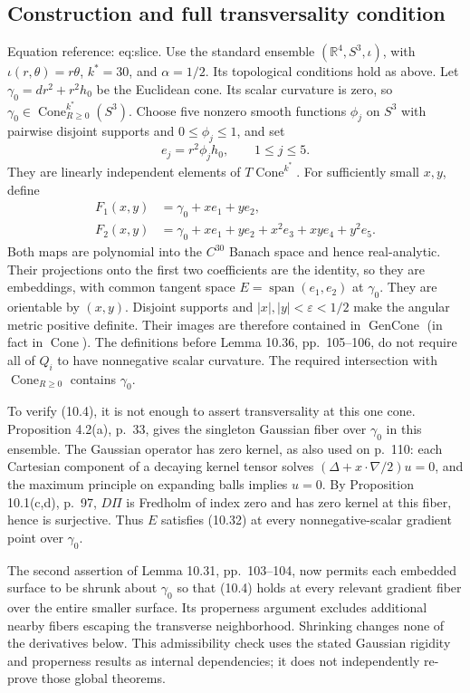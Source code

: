 \documentclass[10pt]{article}
\begin{document}
\subsection*{Construction and full transversality condition}
Equation reference: eq:slice. Use the standard ensemble \((\mathbb R^4,S^3,\iota)\), with \(\iota(r,\theta)=r\theta\), \(k^*=30\), and \(\alpha=1/2\). Its topological conditions hold as above. Let \(\gamma_0=dr^2+r^2h_0\) be the Euclidean cone. Its scalar curvature is zero, so \(\gamma_0\in\operatorname{Cone}_{R\geq0}^{k^*}(S^3)\). Choose five nonzero smooth functions \(\phi_j\) on \(S^3\) with pairwise disjoint supports and \(0\leq\phi_j\leq1\), and set \[e_j=r^2\phi_j h_0,\qquad 1\leq j\leq5 .\] They are linearly independent elements of \(T\operatorname{Cone}^{k^*}\). For sufficiently small \(x,y\), define \[\begin{aligned}
 F_1(x,y)&=\gamma_0+xe_1+ye_2,\\
 F_2(x,y)&=\gamma_0+xe_1+ye_2+x^2e_3+xye_4+y^2e_5. \end{aligned}\] Both maps are polynomial into the \(C^{30}\) Banach space and hence real-analytic. Their projections onto the first two coefficients are the identity, so they are embeddings, with common tangent space \(E=\operatorname{span}(e_1,e_2)\) at \(\gamma_0\). They are orientable by \((x,y)\). Disjoint supports and \(|x|,|y|<\varepsilon<1/2\) make the angular metric positive definite. Their images are therefore contained in \(\operatorname{GenCone}\) (in fact in \(\operatorname{Cone}\)). The definitions before Lemma 10.36, pp. 105–106, do not require all of \(Q_i\) to have nonnegative scalar curvature. The required intersection with \(\operatorname{Cone}_{R\geq0}\) contains \(\gamma_0\).\par
To verify (10.4), it is not enough to assert transversality at this one cone. Proposition 4.2(a), p. 33, gives the singleton Gaussian fiber over \(\gamma_0\) in this ensemble. The Gaussian operator has zero kernel, as also used on p. 110: each Cartesian component of a decaying kernel tensor solves \((\Delta+x\cdot\nabla/2)u=0\), and the maximum principle on expanding balls implies \(u=0\). By Proposition 10.1(c,d), p. 97, \(D\Pi\) is Fredholm of index zero and has zero kernel at this fiber, hence is surjective. Thus \(E\) satisfies (10.32) at every nonnegative-scalar gradient point over \(\gamma_0\).\par
The second assertion of Lemma 10.31, pp. 103–104, now permits each embedded surface to be shrunk about \(\gamma_0\) so that (10.4) holds at every relevant gradient fiber over the entire smaller surface. Its properness argument excludes additional nearby fibers escaping the transverse neighborhood. Shrinking changes none of the derivatives below. This admissibility check uses the stated Gaussian rigidity and properness results as internal dependencies; it does not independently re-prove those global theorems.\par
\end{document}
